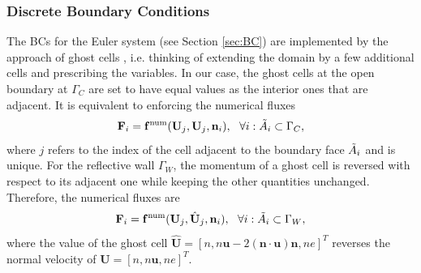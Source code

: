 \documentclass{article}
\begin{document}
\subsubsection{Discrete Boundary Conditions}
The BCs for the Euler system (see Section \ref{sec:BC}) are implemented by the approach of ghost cells \cite[][ch. 7]{leveque_2007}, i.e. thinking of extending the domain by a few additional cells and prescribing the variables. In our case, the ghost cells at the open boundary at $\Gamma_C$ are set to have equal values as the interior ones that are adjacent. It is equivalent to enforcing the numerical fluxes
\begin{equation*}
    \mathbf{F}_i = {\mathbf{f}^\text{num}}(\mathbf{U}_j, \mathbf{U}_j, \mathbf{n}_i), \ \ \forall i: \Tilde{A}_i \subset \Gamma_C,
\end{equation*}
where $j$ refers to the index of the cell adjacent to the boundary face $\Tilde{A}_i$ and is unique. For the reflective wall $\Gamma_W$, the momentum of a ghost cell is reversed with respect to its adjacent one while keeping the other quantities unchanged. Therefore, the numerical fluxes are 
\begin{equation*}
    \mathbf{F}_i = \mathbf{f}^\text{num}(\mathbf{U}_j, \hat{\mathbf{U}}_j, \mathbf{n}_i), \ \ \forall i: \Tilde{A}_i \subset \Gamma_W,
\end{equation*}
where the value of the ghost cell $\hat{\mathbf{U}} = [n, n\mathbf{u} - 2(\mathbf{n}\cdot\mathbf{u})\mathbf{n}, ne]^T$ reverses the normal velocity of $\mathbf{U} = [n, n\mathbf{u}, ne]^T$. 
\end{document}
